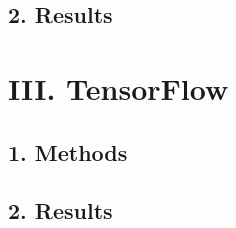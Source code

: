 \subsection*{\large 2. Results}

\newpage
\section*{\Large III. TensorFlow}

\subsection*{\large 1. Methods}

\subsection*{\large 2. Results}





\clearpage

%
%
%



